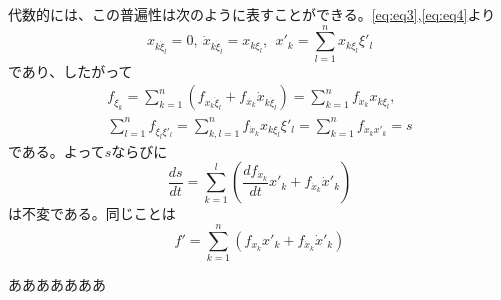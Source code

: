 \documentclass[dvipdfmx, leqno]{jsbook}
\begin{document}
    代数的には、この普遍性は次のように表すことができる。\eqref{eq:eq3},\eqref{eq:eq4}より
\begin{equation}
    x_{k\dot{\xi}_l}= 0,\ \dot{x}_{k\dot{\xi}_l}= x_{k\xi_l},\ \ x'_k= \sum_{l= 1}^n x_{k\xi_l}\xi'_l
\end{equation}
    であり、したがって
\begin{align}
    f_{\dot{\xi}_k}= \sum_{k= 1}^n (f_{x_k\dot{\xi}_l}+ f_{\dot{x_k}}\dot{x}_{k\dot{\xi}_l})= \sum_{k= 1}^n f_{\dot{x}_k}x_{k\xi_l},\\
    \sum_{l= 1}^n f_{\dot{\xi}_l\xi'_l}= \sum_{k, l= 1}^n f_{\dot{x}_k}x_{k\xi_l}\xi'_l= \sum_{k= 1}^n f_{\dot{x}_kx'_k}= s
\end{align}
    である。よって$s$ならびに
\begin{equation}
    \frac{ds}{dt}= \sum_{k= 1}^l \left(\frac{df_{\dot{x}_k}}{dt}x'_k+ f_{\dot{x}_k}\dot{x}'_k\right)
\end{equation}
    は不変である。同じことは
\begin{equation}
    f'= \sum_{k= 1}^n (f_{x_k}x'_k+ f_{\dot{x}_k}\dot{x}'_k)
\end{equation}

\newpage

    あああああああ

\newpage

\end{document}
